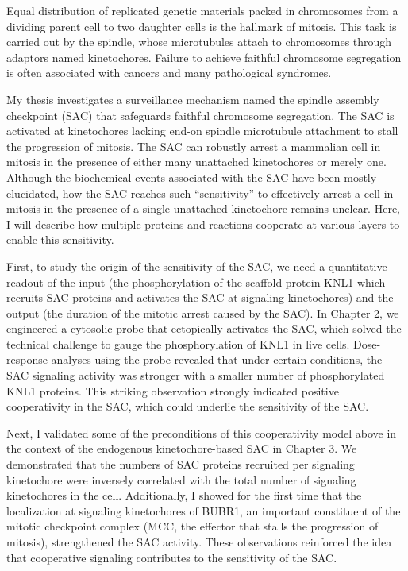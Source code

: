 Equal distribution of replicated genetic materials packed in chromosomes from a dividing parent cell to two daughter cells is the hallmark of mitosis. This task is carried out by the spindle, whose microtubules attach to chromosomes through adaptors named kinetochores. Failure to achieve faithful chromosome segregation is often associated with cancers and many pathological syndromes.

My thesis investigates a surveillance mechanism named the spindle assembly checkpoint (SAC) that safeguards faithful chromosome segregation. The SAC is activated at kinetochores lacking end-on spindle microtubule attachment to stall the progression of mitosis. The SAC can robustly arrest a mammalian cell in mitosis in the presence of either many unattached kinetochores or merely one. Although the biochemical events associated with the SAC have been mostly elucidated, how the SAC reaches such ``sensitivity'' to effectively arrest a cell in mitosis in the presence of a single unattached kinetochore remains unclear. Here, I will describe how multiple proteins and reactions cooperate at various layers to enable this sensitivity.

First, to study the origin of the sensitivity of the SAC, we need a quantitative readout of the input (the phosphorylation of the scaffold protein KNL1 which recruits SAC proteins and activates the SAC at signaling kinetochores) and the output (the duration of the mitotic arrest caused by the SAC). In Chapter 2, we engineered a cytosolic probe that ectopically activates the SAC, which solved the technical challenge to gauge the phosphorylation of KNL1 in live cells. Dose-response analyses using the probe revealed that under certain conditions, the SAC signaling activity was stronger with a smaller number of phosphorylated KNL1 proteins. This striking observation strongly indicated positive cooperativity in the SAC, which could underlie the sensitivity of the SAC.

Next, I validated some of the preconditions of this cooperativity model above in the context of the endogenous kinetochore-based SAC in Chapter 3. We demonstrated %
that the numbers of SAC proteins recruited per signaling kinetochore were inversely correlated with the total number of signaling kinetochores in the cell. Additionally, I showed for the first time that the localization at signaling kinetochores of BUBR1, an important constituent of the mitotic checkpoint complex (MCC, the effector that stalls the progression of mitosis), strengthened the SAC activity. These observations reinforced the idea that cooperative signaling contributes to the sensitivity of the SAC.

